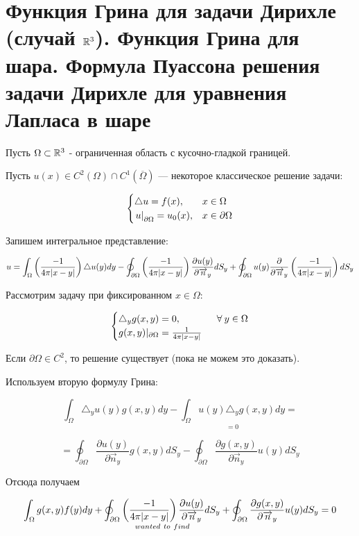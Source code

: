 \section{Функция Грина для задачи Дирихле (случай $\mathbb{R}^3$). Функция Грина для шара. Формула Пуассона решения задачи Дирихле для уравнения Лапласа в шаре}

Пусть $\Omega \subset \mathbb{R}^3$ - ограниченная область с кусочно-гладкой границей.

Пусть $u(x) \in C^2(\Omega) \cap C^1(\overline{\Omega})$ --- некоторое классическое решение задачи:

\[\begin{cases}
   \triangle u = f(x), & x\in \Omega \\
   \left. u\right|_{\partial \Omega} = u_0(x), & x \in \partial \Omega  
\end{cases}\]  

Запишем интегральное представление:

$$ u = \int_{\Omega}{\left(\frac{-1}{4 \pi |x-y|}\right)  {\triangle u(y)} dy} - \oint_{\partial \Omega}{\left(\frac{-1}{4 \pi |x-y|}\right) \frac{\partial u(y)}{\partial \overrightarrow{n}_y} d S_y} + 
\oint_{\partial \Omega}{ {u(y)} \frac{\partial}{\partial \overrightarrow{n}_y}\left(\frac{-1}{4 \pi |x-y|}\right)d S_y}
$$

Рассмотрим задачу при фиксированном $x \in \Omega$:

\[\begin{cases}
   \triangle_y g(x,y) = 0, & \;\;\forall\: y \in \Omega \\
   g(x,y)|_{\partial \Omega} = \frac{1}{4 \pi |x-y|}  
\end{cases}\] 

Если $\partial \Omega \in C^2$, то решение существует (пока не можем это доказать).

Используем вторую формулу Грина:

$$ \int_{\Omega}{\triangle_y u(y) g(x,y)dy} - 
{\underset{=0}{\int_{\Omega}{u(y) \triangle_y g(x,y) dy}}}=$$

$$=\oint_{\partial \Omega} {\frac{\partial u(y)}{\partial \overrightarrow{n}_y} g(x,y) dS_y} - \oint_{\partial \Omega} {\frac{\partial g(x,y)}{\partial \overrightarrow{n}_y} u(y) dS_y} $$

Отсюда получаем

$$\int_{\Omega}{g(x,y) f(y) dy} + \underset{wanted~to~find}{\oint_{\partial \Omega}{\left(\frac{-1}{4 \pi |x-y|}\right) \frac{\partial u(y)}{\partial \overrightarrow{n}_y} d S_y}}+ \oint_{\partial \Omega}
{\frac{\partial g(x,y)}{\partial \overrightarrow{n}_y}u(y) dS_y} = 0
$$

